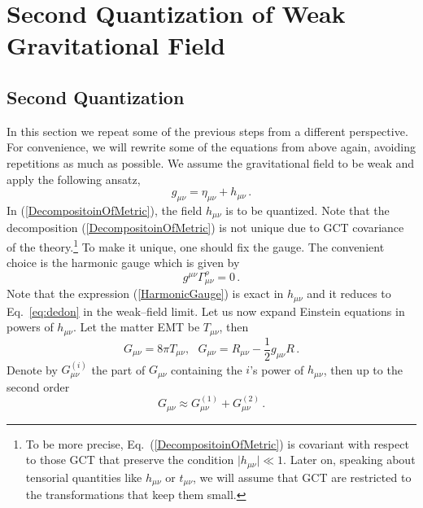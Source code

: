 \documentclass[12pt]{article}
\newcommand{\be}{\begin{equation}}
\newcommand{\ee}{\end{equation}}
\newcommand\m{\mu}
\newcommand\n{\nu}
\renewcommand\l{\lambda}
\def\d{\partial}
\begin{document}
\section{Second Quantization of Weak Gravitational Field}
\label{sec:quant}

\subsection{Second Quantization}


In this section we repeat some of the previous steps from a different perspective.
For convenience, we will rewrite some of the equations from above again, avoiding repetitions as much as possible.
We assume the gravitational field to be weak and apply the following ansatz,
\begin{equation}\label{DecompositoinOfMetric}
g_{\mu\nu}=\eta_{\mu\nu}+h_{\mu\nu} \,.
\end{equation}
In (\ref{DecompositoinOfMetric}), the field $h_{\mu\nu}$ is to be quantized. Note that the decomposition (\ref{DecompositoinOfMetric}) is not unique due to GCT covariance of the theory.\footnote{To be more precise, Eq.~(\ref{DecompositoinOfMetric}) is covariant with respect to those GCT that preserve the condition $\vert h_{\mu\nu}\vert\ll 1$. Later on, speaking about tensorial quantities like $h_{\mu\nu}$ or $t_{\mu\nu}$, we will
assume that GCT are restricted to the transformations that keep them small.}
To make it unique, one should fix the gauge. The convenient choice is the harmonic gauge which is given by
\begin{equation}\label{HarmonicGauge}
g^{\mu\nu}\Gamma^\rho_{\mu\nu}=0\,.
\end{equation}
Note that the expression (\ref{HarmonicGauge}) is exact in $h_{\mu\nu}$ and
it reduces to Eq.~\eqref{eq:dedon}
in the weak--field limit.
Let us now expand Einstein equations in powers of $h_{\mu\nu}$. Let the matter EMT be $T_{\mu\nu}$, then
\begin{equation}\label{EinsteinEq}
G_{\mu\nu}=8\pi T_{\mu\nu},~~~ G_{\mu\nu}=R_{\mu\nu}-\dfrac{1}{2}g_{\mu\nu}R \,.
\end{equation}
Denote by $G^{(i)}_{\mu\nu}$ the part of $G_{\mu\nu}$ containing the $i$'s power of $h_{\mu\nu}$, then up to the second order
\begin{equation}\label{ExpansionOfG}
G_{\mu\nu}\approx G^{(1)}_{\mu\nu}+G^{(2)}_{\mu\nu} \,.
\end{equation}
\end{document}
